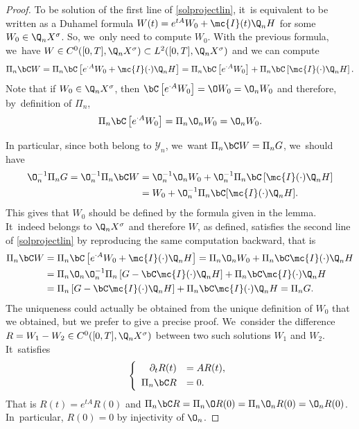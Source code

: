 \begin{proof}
To be solution of the first line of \eqref{solprojectlin}, it~is equivalent to be written as a Duhamel formula $W(t)=e^{tA}W_{0}+\mc{I}(t)\Q_nH$ for some $W_{0}\in \Q_{n}X^{\sigma}$. So, we~only need to compute $W_{0}$. With the previous formula, we~have $W\in C^{0}([0,T],\Q_{n}X^{\sigma})\subset L^{2}([0,T],\Q_{n}X^{\sigma})$ and we can compute
\begin{align*}
\Pi_n\bC W= \Pi_n\bC \left[e^{\cdot A}W_{0}+\mc{I}(\cdot)\Q_nH \right]=\Pi_n\bC \left[e^{\cdot A}W_{0} \right]+\Pi_n\bC \left[\mc{I}(\cdot)\Q_nH \right].
\end{align*}
Note that if $W_{0}\in \Q_{n}X^{\sigma}$, then $\bC\left[e^{\cdot A}W_{0}\right]=\O W_{0}=\O_{n} W_{0}$ and therefore, by~definition of $\Pi_{n}$,
\begin{align*}
\Pi_{n}\bC\left[e^{\cdot A}W_{0}\right]=\Pi_{n}\O_{n} W_{0}=\O_{n} W_{0}.
\end{align*}

In particular, since both belong to $\mathcal{Y}_n$, we~want $ \Pi_n\bC W=\Pi_{n}G$, we~should have
\begin{align*}
\O_n^{-1}\Pi_{n}G= \O_n^{-1} \Pi_n\bC W &=\O_n^{-1}\O_{n} W_{0}+\O_n^{-1}\Pi_n\bC \left[\mc{I}(\cdot)\Q_nH \right]\\ &=W_{0}+\O_n^{-1}\Pi_n\bC[\mc{I}(\cdot)\Q_nH].
\end{align*}
This gives that $W_{0}$ should be defined by the formula given in the lemma. It~indeed belongs to $\Q_{n}X^{\sigma}$ and therefore $W$, as defined, satisfies the second line of \eqref{solprojectlin} by reproducing the same computation backward, that is\vspace*{-3pt}
\begin{align*}
\Pi_n\bC W&=\Pi_n\bC\left[e^{\cdot A}W_{0}+\mc{I}(\cdot)\Q_nH\right] =\Pi_{n} \O_{n}W_{0}+\Pi_n\bC\mc{I}(\cdot)\Q_nH\\
&=\Pi_{n} \O_{n}\O_n^{-1}\Pi_n\left[G-\bC\mc{I}(\cdot)\Q_n H\right]+\Pi_n\bC\mc{I}(\cdot)\Q_nH\\
&=\Pi_n\left[G-\bC\mc{I}(\cdot)\Q_n H\right]+\Pi_n\bC\mc{I}(\cdot)\Q_nH=\Pi_{n}G.
\end{align*}
The uniqueness could actually be obtained from the unique definition of $W_{0}$ that we obtained, but we prefer to give a precise proof. We~consider the difference $R=W_{1}-W_{2}\in C^{0}([0,T],\Q_{n}X^{\sigma})$ between two such solutions $W_{1}$ and $W_{2}$. It~satisfies\vspace*{-3pt}
\begin{align*}
\left\{\begin{array}{rl}
\partial_t R(t)&=AR(t), \\[3pt]
\Pi_n\bC R &=0.
\end{array}\right.
\end{align*}
That is $R(t)=e^{tA}R(0)$ and $\Pi_n\bC R=\Pi_{n}\O R(0)=\Pi_{n}\O_{n}R(0)=\O_{n}R(0)$. In~particular, $R(0)=0$ by injectivity of $\O_{n}$.


\end{proof}
